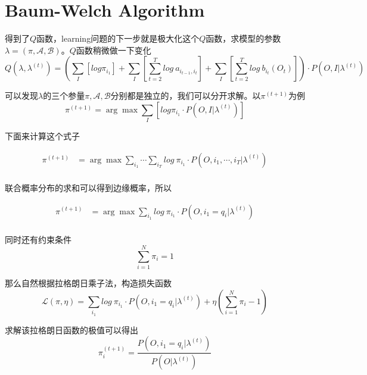 \section{Baum-Welch Algorithm}

得到了$Q$函数，learning问题的下一步就是极大化这个$Q$函数，求模型的参数$\lambda=(\pi,\mathcal{A},\mathcal{B})$。$Q$函数稍微做一下变化
\begin{equation}
    Q(\lambda,\lambda^{(t)}) = (\sum_{I} \left[log \pi_{i_1}\right]+\sum_{I} \left[\sum_{t=2}^{T}log\ a_{i_{t-1},i_t}\right]+\sum_{I} \left[\sum_{t=2}^{T}log\ b_{i_t}(O_t)\right])\cdot P(O,I|\lambda^{(t)})
\end{equation}

可以发现$\lambda$的三个参量$\pi,\mathcal{A},\mathcal{B}$分别都是独立的，我们可以分开求解。以$\pi^{(t+1)}$为例
\begin{equation}
    \pi^{(t+1)}=\arg\max \sum_{I} \left[log \pi_{i_1}\cdot P(O,I|\lambda^{(t)})\right]
\end{equation}

下面来计算这个式子

\begin{equation}
    \begin{aligned}
        \pi^{(t+1)}&=\arg\max \sum_{i_1}\cdots \sum_{i_T} log\ \pi_{i_1}\cdot P(O,i_1,\cdots,i_T|\lambda^{(t)})\\
    \end{aligned}
\end{equation}

联合概率分布的求和可以得到边缘概率，所以

\begin{equation}
    \begin{aligned}
        \pi^{(t+1)}&=\arg\max \sum_{i_1} log\ \pi_{i_1}\cdot P(O,i_1=q_i|\lambda^{(t)})\\
    \end{aligned}
\end{equation}

同时还有约束条件
\begin{equation}
    \sum_{i=1}^{N}\pi_i=1
\end{equation}

那么自然根据拉格朗日乘子法，构造损失函数
\begin{equation}
    \mathcal{L}(\pi,\eta)=\sum_{i_1} log\ \pi_{i_1}\cdot P(O,i_1=q_i|\lambda^{(t)})+\eta\left(\sum_{i=1}^{N}\pi_i-1\right)
\end{equation}

求解该拉格朗日函数的极值可以得出
\begin{equation}
    \pi^{(t+1)}_i=\frac{P(O,i_1=q_i|\lambda^{(t)})}{P(O|\lambda^{(t)})}
\end{equation}

